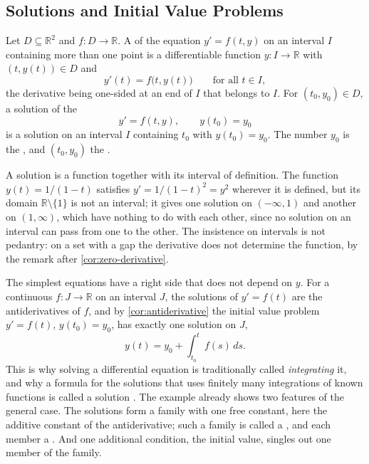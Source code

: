\subsection{Solutions and Initial Value Problems}

\begin{definition}
\label{def:ode-solution}
Let $D\subseteq\mathbb R^2$ and $f\colon D\to\mathbb R$. A  of the equation $y'=f(t,y)$ on an interval $I$ containing more than one point is a differentiable function $y\colon I\to\mathbb R$ with $(t,y(t))\in D$ and
\[
y'(t)=f\bigl(t,y(t)\bigr)\qquad\text{for all }t\in I ,
\]
the derivative being one-sided at an end of $I$ that belongs to $I$. For $(t_0,y_0)\in D$, a solution of the 
\begin{equation}
y'=f(t,y),\qquad y(t_0)=y_0
\label{eq:ivp}
\end{equation}
is a solution on an interval $I$ containing $t_0$ with $y(t_0)=y_0$. The number $y_0$ is the , and $(t_0,y_0)$ the .
\end{definition}

A solution is a function together with its interval of definition. The function $y(t)=1/(1-t)$ satisfies $y'=1/(1-t)^2=y^2$ wherever it is defined, but its domain $\mathbb R\setminus\{1\}$ is not an interval; it gives one solution on $(-\infty,1)$ and another on $(1,\infty)$, which have nothing to do with each other, since no solution on an interval can pass from one to the other. The insistence on intervals is not pedantry: on a set with a gap the derivative does not determine the function, by the remark after \cref{cor:zero-derivative}.

The simplest equations have a right side that does not depend on $y$. For a continuous $f\colon J\to\mathbb R$ on an interval $J$, the solutions of $y'=f(t)$ are the antiderivatives of $f$, and by \cref{cor:antiderivative} the initial value problem $y'=f(t)$, $y(t_0)=y_0$, has exactly one solution on $J$,
\[
y(t)=y_0+\int_{t_0}^tf(s)\,ds .
\]
This is why solving a differential equation is traditionally called \emph{integrating} it, and why a formula for the solutions that uses finitely many integrations of known functions is called a solution . The example already shows two features of the general case. The solutions form a family with one free constant, here the additive constant of the antiderivative; such a family is called a , and each member a . And one additional condition, the initial value, singles out one member of the family.

